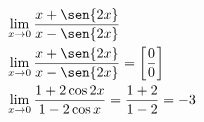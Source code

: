 \begin{ex}
\begin{align}
&\lim_{x\rightarrow 0} \frac{x+\sen{2x}}{x-\sen{2x}}\nonumber\\
&\lim_{x\rightarrow 0} \frac{x+\sen{2x}}{x-\sen{2x}}=\left[\frac{0}{0}\right]\nonumber\\
&\lim_{x\rightarrow 0} \frac{1+2\cos{2x}}{1-2\cos{x}}=\frac{1+2}{1-2}=-3\nonumber
\end{align}
\end{ex}